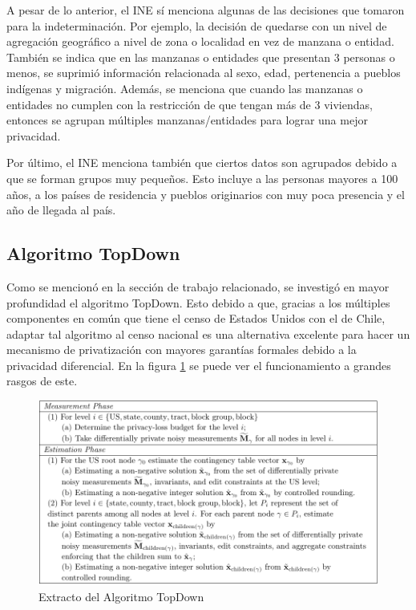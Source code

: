 \documentclass[informe]{upropuesta}
\begin{document}
A pesar de lo anterior, el INE sí menciona algunas de las decisiones que tomaron para la indeterminación. Por ejemplo, la decisión de quedarse con un nivel de agregación geográfico a nivel de zona o localidad en vez de manzana o entidad. También se indica que en las manzanas o entidades que presentan 3 personas o menos, se suprimió información relacionada al sexo, edad, pertenencia a pueblos indígenas y migración. Además, se menciona que cuando las manzanas o entidades no cumplen con la restricción de que tengan más de 3 viviendas, entonces se agrupan múltiples manzanas/entidades para lograr una mejor privacidad. 

Por último, el INE menciona también que ciertos datos son agrupados debido a que se forman grupos muy pequeños. Esto incluye a las personas mayores a 100 años, a los países de residencia y pueblos originarios con muy poca presencia y el año de llegada al país.

\subsection{Algoritmo TopDown}

Como se mencionó en la sección de trabajo relacionado, se investigó en mayor profundidad el algoritmo TopDown. Esto debido a que, gracias a los múltiples componentes en común que tiene el censo de Estados Unidos con el de Chile, adaptar tal algoritmo al censo nacional es una alternativa excelente para hacer un mecanismo de privatización con mayores garantías formales debido a la privacidad diferencial. En la figura \ref{fig:TopDown} se puede ver el funcionamiento a grandes rasgos de este.

\begin{figure}[H]
    \centering
    \includegraphics[width=\linewidth]{imagenes/investigacion/TopDown_algorithm.pdf}
    \caption{Extracto del Algoritmo TopDown~\cite{Abowd2022}}
    \label{fig:TopDown}
\end{figure}
\end{document}

